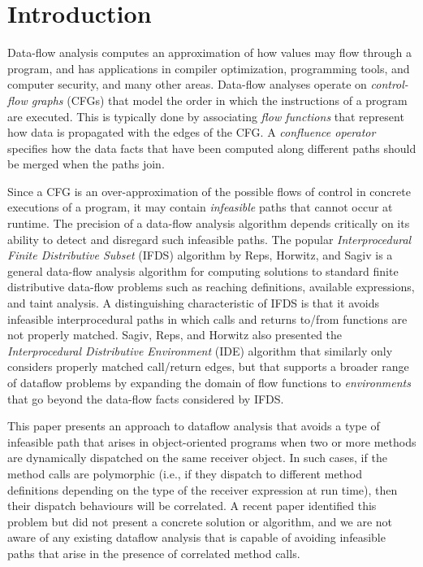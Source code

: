 \section{Introduction}

Data-flow analysis computes an approximation of how values may flow  
through a program, and has applications in compiler optimization, 
programming tools, and computer security, and many other areas.
Data-flow analyses operate on \textit{control-flow graphs} (CFGs)
that model 
the order in which the instructions of a program are executed. This is
typically done by associating \textit{flow functions} that represent how 
data is propagated with the edges of the CFG.  A 
\textit{confluence operator} specifies how the data facts that have been 
computed along different paths should be merged when the paths join.

Since a CFG is an over-approximation of the possible flows 
of control in concrete executions of a program, it may contain \textit{infeasible} 
paths that cannot occur at runtime. The precision of a data-flow analysis algorithm
depends critically on its ability to detect and disregard such infeasible paths.
The popular \textit{Interprocedural Finite Distributive Subset} (IFDS) algorithm 
by  Reps, Horwitz, and Sagiv \cite{reps1995precise} is a general data-flow analysis
algorithm for computing solutions to standard finite distributive data-flow problems such 
as reaching definitions, available expressions, and taint analysis.
A distinguishing 
characteristic of IFDS is that it avoids infeasible interprocedural paths in which calls 
and returns to/from functions are not properly matched. Sagiv, Reps, and Horwitz
also presented the \textit{Interprocedural Distributive Environment} (IDE) algorithm
\cite{sagiv1996precise} that similarly only considers properly matched call/return
edges, but that supports a broader range of dataflow problems by expanding the 
domain of flow functions to \textit{environments} that go beyond the data-flow facts 
considered by IFDS.

This paper presents an approach to dataflow analysis that avoids a type
of infeasible path that arises in object-oriented programs when two or more
methods are dynamically dispatched on the same receiver object.
In such cases, if the
method calls are polymorphic (i.e., if they dispatch to different method definitions 
depending on the type of the receiver expression at run time), then their dispatch 
behaviours will be correlated. A recent paper \cite{DBLP:journals/scp/Tip15} identified
this problem but did not present a concrete solution or algorithm, and we are not aware 
of any existing dataflow analysis that is capable of avoiding infeasible paths that arise 
in the presence of correlated method calls.

